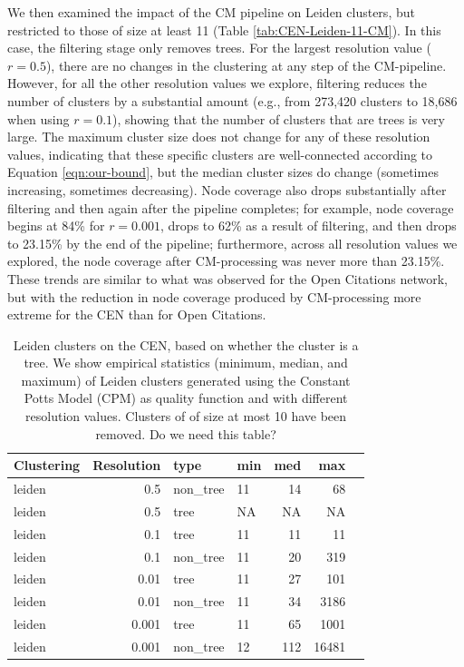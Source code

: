 \documentclass[11pt]{article}   	%
\begin{document}
We then examined the impact of the CM pipeline on Leiden clusters, but restricted to those of size at least 11 (Table \ref{tab:CEN-Leiden-11-CM}).
In this case, the filtering stage only removes trees.
For the largest resolution value ($r=0.5$), there are no changes in the clustering at any step of the CM-pipeline.
However, for all the other resolution values we explore, filtering reduces the number of clusters by a substantial amount (e.g., from 273,420 clusters to 18,686 when using $r=0.1$), showing that the number of clusters that are trees is very large.
The maximum cluster size does not change for any of these resolution values, indicating that these specific clusters are well-connected according to
Equation \ref{eqn:our-bound}, but the median cluster sizes do change (sometimes increasing, sometimes decreasing). 
Node coverage also drops substantially after filtering and then again after the pipeline completes; for example,
node coverage begins at 84\% for $r=0.001$, drops to 62\% as a result of filtering, and then drops to 23.15\% by the end of the
pipeline; furthermore, 
across all resolution values we explored, the node coverage after CM-processing was never more than 23.15\%.
These trends are  similar to what was observed for the Open Citations network, but with the reduction in node coverage produced by CM-processing
more extreme for the CEN than for Open Citations.
\begin{table}[H]
\centering
\begin{tabular}{lrllrrr}
  \hline
 Clustering & Resolution & type & min & med & max \\
  \hline
leiden & 0.5 & non\_tree &  11 & 14 &  68 \\
leiden & 0.5 & tree &  NA & NA &  NA \\
leiden & 0.1 & tree &  11 & 11 &  11 \\
leiden  & 0.1 & non\_tree &  11 & 20 & 319 \\
leiden  & 0.01 & tree &  11 & 27 & 101 \\
leiden & 0.01 & non\_tree &  11 & 34 & 3186 \\
leiden & 0.001 & tree &  11 & 65 & 1001 \\
leiden & 0.001 & non\_tree &  12 & 112 & 16481 \\

   \hline
\end{tabular}
\caption{Leiden clusters on the CEN, based on whether the cluster is a tree. We show empirical statistics (minimum, median, and maximum) of Leiden clusters generated using the Constant Potts Model (CPM) as quality function and with different resolution values. Clusters of of size at most 10 have been removed. Do we need this table?}
\end{table}
\end{document}
